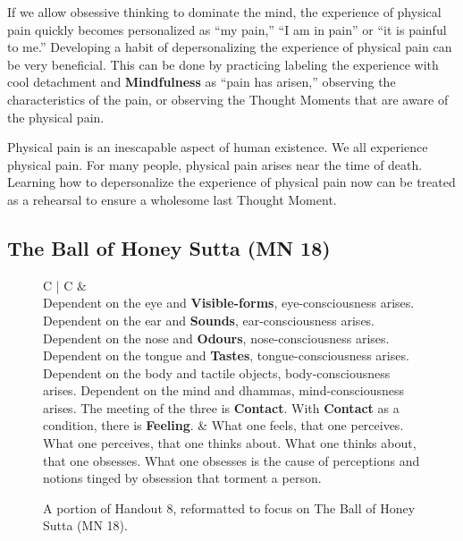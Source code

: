 If we allow obsessive thinking to dominate the mind, the experience of physical pain quickly becomes personalized as “my pain,” “I am in pain” or “it is painful to me.” Developing a habit of depersonalizing the experience of physical pain can be very beneficial. This can be done by practicing labeling the experience with cool detachment and \textbf{Mindfulness} as “pain has arisen,” observing the characteristics of the pain, or observing the Thought Moments that are aware of the physical pain.

Physical pain is an inescapable aspect of human existence. We all experience physical pain. For many people, physical pain arises near the time of death. Learning how to depersonalize the experience of physical pain now can be treated as a rehearsal to ensure a wholesome last Thought Moment.

\subsection*{The Ball of Honey Sutta (MN 18)}

\begin{figure}[H]
\begin{tabular*}{\textwidth}{C{\tabcolsep} | C{\tabcolsep}}
\toprule
{} &  \\
\midrule
 Dependent on the eye and \textbf{Visible-forms}, eye-consciousness arises.\newline
 Dependent on the ear and \textbf{Sounds}, ear-consciousness arises.\newline
 Dependent on the nose and \textbf{Odours}, nose-consciousness arises.\newline
 Dependent on the tongue and \textbf{Tastes}, tongue-consciousness arises.\newline
 Dependent on the body and tactile objects, body-consciousness arises.\newline
 Dependent on the mind and dhammas, mind-consciousness arises.
  \newline\vspace{5mm}
  The meeting of the three is \textbf{Contact}.
  \newline\vspace{5mm}
  With \textbf{Contact} as a condition, there is \textbf{Feeling}.
  &
  What one feels, that one perceives.\newline
  What one perceives, that one thinks about.\newline
  What one thinks about, that one obsesses.\newline
  What one obsesses is the cause of perceptions and notions tinged by obsession that torment a person.
  \\
  
\bottomrule
\end{tabular*}
\caption{A portion of Handout 8, reformatted to focus on The Ball of Honey Sutta (MN 18).}
\end{figure}

